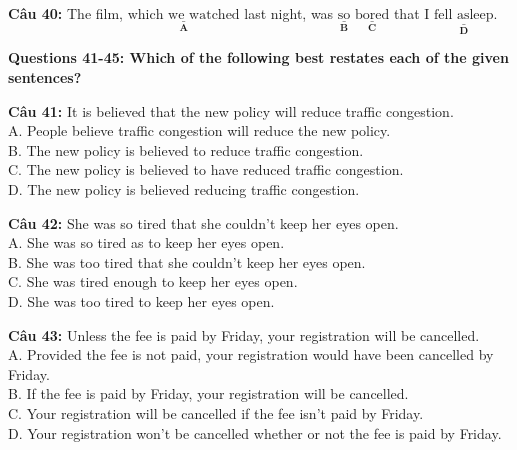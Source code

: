 \documentclass[12pt,a4paper]{article}
\providecommand{\errorpart}[2]{$\underset{\textbf{#1}}{\underline{\text{#2}}}$}
\begin{document}



\noindent \textbf{Câu 40:} The film, \errorpart{A}{which we watched} last night, was \errorpart{B}{so} \errorpart{C}{bored} that I \errorpart{D}{fell asleep}.




\noindent\textbf{Questions 41-45: Which of the following best restates each of the given sentences?}%


\par\nobreak


\noindent \textbf{Câu 41:} It is believed that the new policy will reduce traffic congestion.\\
\noindent A. People believe traffic congestion will reduce the new policy.\\
\noindent B. The new policy is believed to reduce traffic congestion.\\
\noindent C. The new policy is believed to have reduced traffic congestion.\\
\noindent D. The new policy is believed reducing traffic congestion.




\noindent \textbf{Câu 42:} She was so tired that she couldn't keep her eyes open.\\
\noindent A. She was so tired as to keep her eyes open.\\
\noindent B. She was too tired that she couldn't keep her eyes open.\\
\noindent C. She was tired enough to keep her eyes open.\\
\noindent D. She was too tired to keep her eyes open.




\noindent \textbf{Câu 43:} Unless the fee is paid by Friday, your registration will be cancelled.\\
\noindent A. Provided the fee is not paid, your registration would have been cancelled by Friday.\\
\noindent B. If the fee is paid by Friday, your registration will be cancelled.\\
\noindent C. Your registration will be cancelled if the fee isn't paid by Friday.\\
\noindent D. Your registration won't be cancelled whether or not the fee is paid by Friday.
\end{document}
